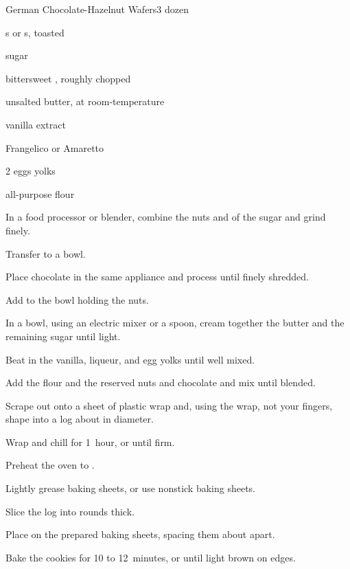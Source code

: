 \begin{recipe}{German Chocolate-Hazelnut Wafers}{}{3 dozen}

\begin{ingredients}
\item {} s or s, toasted
\item \C{\third} sugar
\item {} bittersweet , roughly chopped
\item \C{\half} unsalted butter, at room-temperature
\item {} vanilla extract
\item {} Frangelico or Amaretto
\item 2 eggs yolks
\item {} all-purpose flour
\end{ingredients}

\begin{directions}
\item In a food processor or blender, combine the nuts and  of the sugar and grind finely.
\item Transfer to a bowl.
\item Place chocolate in the same appliance and process until finely shredded.
\item Add to the bowl holding the nuts.
\item In a bowl, using an electric mixer or a spoon, cream together the butter and the remaining sugar until light.
\item Beat in the vanilla, liqueur, and egg yolks until well mixed.
\item Add the flour and the reserved nuts and chocolate and mix until blended.
\item Scrape out onto a sheet of plastic wrap and, using the wrap, not your fingers, shape into a log about \inch{2\quarter} in diameter.
\item Wrap and chill for 1~hour, or until firm.
\item Preheat the oven to .
\item Lightly grease baking sheets, or use nonstick baking sheets.
\item Slice the log into rounds \cm{\half} thick.
\item Place on the prepared baking sheets, spacing them about \cm{1\half} apart.
\item Bake the cookies for 10 to 12~minutes, or until light brown on edges.
\end{directions}

\end{recipe}
